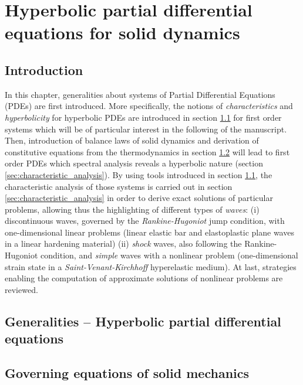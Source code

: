 \chapter{Hyperbolic partial differential equations for solid dynamics}

\section*{Introduction}
In this chapter, generalities about systems of Partial Differential Equations (PDEs) are first introduced. More specifically, the notions of \textit{characteristics} and \textit{hyperbolicity} for hyperbolic PDEs are introduced in section \ref{sec:PDEs} for first order systems which will be of particular interest in the following of the manuscript.
Then, introduction of balance laws of solid dynamics and derivation of constitutive equations from the thermodynamics in section \ref{sec:solidMech_equations} will lead to first order PDEs which spectral analysis reveals a hyperbolic nature (section \ref{sec:characteristic_analysis}). By using tools introduced in section \ref{sec:PDEs}, the characteristic analysis of those systems is carried out in section \ref{sec:characteristic_analysis} in order to derive exact solutions of particular problems, allowing thus the highlighting of different types of \textit{waves}: (i) discontinuous waves, governed by the \textit{Rankine-Hugoniot} jump condition, with one-dimensional linear problems (linear elastic bar and elastoplastic plane waves in a linear hardening material) (ii) \textit{shock} waves, also following the Rankine-Hugoniot condition, and \textit{simple} waves with a nonlinear problem (one-dimensional strain state in a \textit{Saint-Venant-Kirchhoff} hyperelastic medium). At last, strategies enabling the computation of approximate solutions of nonlinear problems are reviewed.


\section{Generalities -- Hyperbolic partial differential equations}
\label{sec:PDEs}


\section{Governing equations of solid mechanics}
\label{sec:solidMech_equations}



